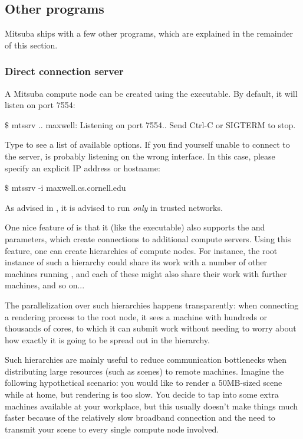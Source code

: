 \subsection{Other programs}
Mitsuba ships with a few other programs, which are explained in the remainder of this section.
\subsubsection{Direct connection server}
\label{sec:mtssrv}
A Mitsuba compute node can be created using the  executable. By default,
it will listen on port 7554:
\begin{shell}
$\texttt{\$}$ mtssrv
..
maxwell: Listening on port 7554.. Send Ctrl-C or SIGTERM to stop.
\end{shell}
Type  to see a list of available options.
If you find yourself unable to connect to the server,  is probably listening on
the wrong interface. In this case, please specify an explicit IP address or hostname:
\begin{shell}
$\texttt{\$}$ mtssrv -i maxwell.cs.cornell.edu
\end{shell}
As advised in , it is advised to run  \emph{only} in trusted networks.

One nice feature of  is that it (like the  executable)
also supports the  and  parameters, which create connections
to additional compute servers.
Using this feature, one can create hierarchies of compute nodes. For instance,
the root  instance of such a hierarchy could share its work with a
number of other  machines running , and each of these might also
share their work with further machines, and so on...

The parallelization over such hierarchies happens transparently: when
connecting a rendering process to the root node, it sees a machine
with hundreds or thousands of cores, to which it can submit work without
needing to worry about how exactly it is going to be spread out in
the hierarchy.

Such hierarchies are mainly useful to reduce communication bottlenecks when distributing
large resources (such as scenes) to remote machines. Imagine the following hypothetical scenario:
you would like to render a 50MB-sized scene while at home, but rendering is too slow.
You decide to tap into some extra machines available
at your workplace, but this usually doesn't make things much faster because of the relatively slow broadband
connection and the need to transmit your scene to every single compute node involved.

